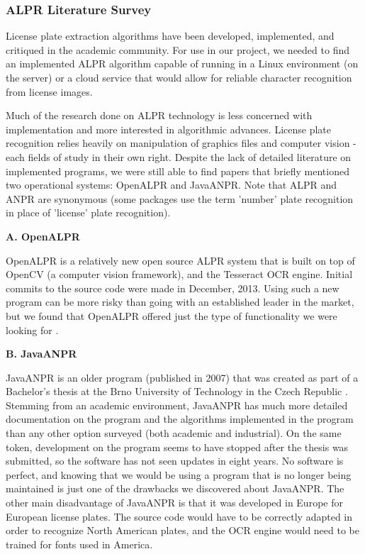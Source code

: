 \documentclass[11pt, oneside, fullpage, doublespace]{article}
\begin{document}
\subsubsection{ALPR Literature Survey}
License plate extraction algorithms have been developed, implemented, and critiqued in the academic community. For use in our project, we needed to find an implemented ALPR algorithm capable of running in a Linux environment (on the server) or a cloud service that would allow for reliable character recognition from license images.

Much of the research done on ALPR technology is less concerned with implementation and more interested in algorithmic advances. License plate recognition relies heavily on manipulation of graphics files and computer vision - each fields of study in their own right. Despite the lack of detailed literature on implemented programs, we were still able to find papers that briefly mentioned two operational systems: OpenALPR and JavaANPR. Note that ALPR and ANPR are synonymous (some packages use the term 'number' plate recognition in place of 'license' plate recognition).

\textbf{A. OpenALPR}

OpenALPR is a relatively new open source ALPR system that is built on top of OpenCV (a computer vision framework), and the Tesseract OCR engine. Initial commits to the source code were made in December, 2013. Using such a new program can be more risky than going with an established leader in the market, but we found that OpenALPR offered just the type of functionality we were looking for \cite{openalpr}.

\textbf{B. JavaANPR}

JavaANPR is an older program (published in 2007) that was created as part of a Bachelor's thesis at the Brno University of Technology in the Czech Republic \cite{javaanpr}. Stemming from an academic environment, JavaANPR has much more detailed documentation on the program and the algorithms implemented in the program than any other option surveyed (both academic and industrial). On the same token, development on the program seems to have stopped after the thesis was submitted, so the software has not seen updates in eight years. No software is perfect, and knowing that we would be using a program that is no longer being maintained is just one of the drawbacks we discovered about JavaANPR. The other main disadvantage of JavaANPR is that it was developed in Europe for European license plates. The source code would have to be correctly adapted in order to recognize North American plates, and the OCR engine would need to be trained for fonts used in America.
\end{document}
